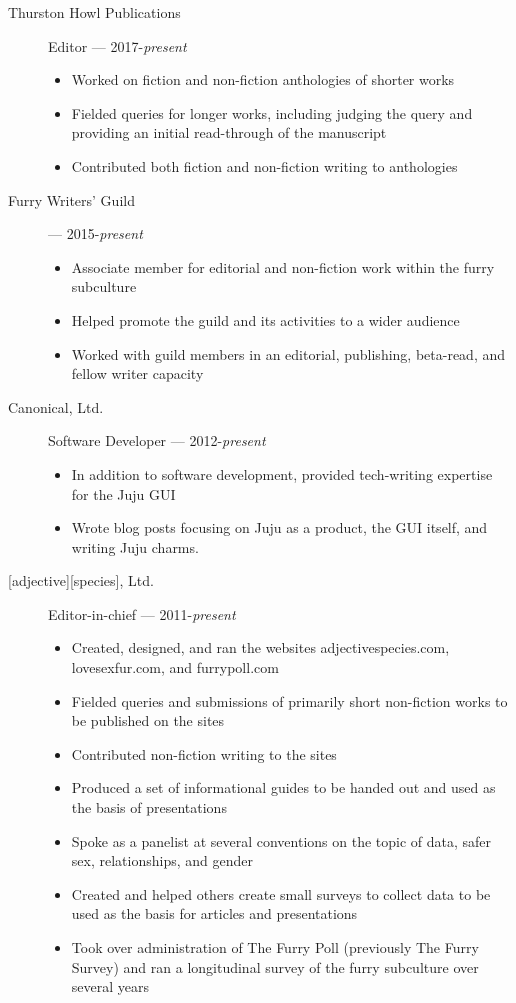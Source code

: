 \begin{description}
\item[Thurston Howl Publications]
Editor --- 2017-\emph{present}

\begin{itemize}
\tightlist
\item
  Worked on fiction and non-fiction anthologies of shorter works
\item
  Fielded queries for longer works, including judging the query and
  providing an initial read-through of the manuscript
\item
  Contributed both fiction and non-fiction writing to anthologies
\end{itemize}
\item[Furry Writers' Guild] --- 2015-\emph{present}

\begin{itemize}
  \item Associate member for editorial and non-fiction work within the furry subculture
  \item Helped promote the guild and its activities to a wider audience
  \item Worked with guild members in an editorial, publishing, beta-read, and fellow writer capacity
\end{itemize}
\item[Canonical, Ltd.]
Software Developer --- 2012-\emph{present}

\begin{itemize}
\tightlist
\item
  In addition to software development, provided tech-writing expertise
  for the Juju GUI
\item
  Wrote blog posts focusing on Juju as a product, the GUI itself, and
  writing Juju charms.
\end{itemize}
\item[{[}adjective{]}{[}species{]}, Ltd.]
Editor-in-chief --- 2011-\emph{present}

\begin{itemize}
\tightlist
\item
  Created, designed, and ran the websites adjectivespecies.com,
  lovesexfur.com, and furrypoll.com
\item
  Fielded queries and submissions of primarily short non-fiction works
  to be published on the sites
\item
  Contributed non-fiction writing to the sites
\item
  Produced a set of informational guides to be handed out and used as
  the basis of presentations
\item
  Spoke as a panelist at several conventions on the topic of data, safer
  sex, relationships, and gender
\item
  Created and helped others create small surveys to collect data to be
  used as the basis for articles and presentations
\item
  Took over administration of The Furry Poll (previously The Furry
  Survey) and ran a longitudinal survey of the furry subculture over
  several years
\end{itemize}
\end{description}
